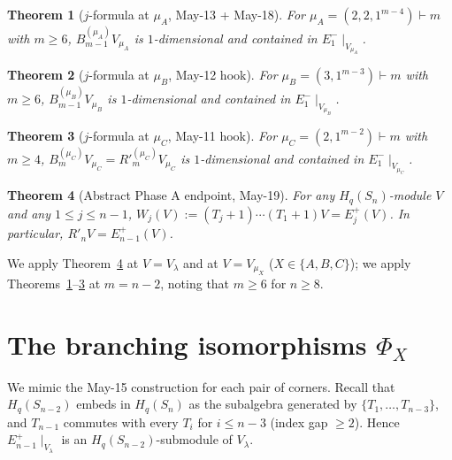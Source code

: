 \documentclass[11pt]{article}
\newtheorem{theorem}{Theorem}
\theoremstyle{definition}
\begin{document}
\begin{theorem}[$j$-formula at $\mu_A$, May-13 + May-18]\label{thm:muA}
For $\mu_A=(2,2,1^{m-4})\vdash m$ with $m\ge 6$,
$B_{m-1}^{(\mu_A)} V_{\mu_A}$ is $1$-dimensional and contained in
$E_1^-\!\mid_{V_{\mu_A}}$.
\end{theorem}

\begin{theorem}[$j$-formula at $\mu_B$, May-12 hook]\label{thm:muB}
For $\mu_B=(3,1^{m-3})\vdash m$ with $m\ge 6$,
$B_{m-1}^{(\mu_B)} V_{\mu_B}$ is $1$-dimensional and contained in
$E_1^-\!\mid_{V_{\mu_B}}$.
\end{theorem}

\begin{theorem}[$j$-formula at $\mu_C$, May-11 hook]\label{thm:muC}
For $\mu_C=(2,1^{m-2})\vdash m$ with $m\ge 4$,
$B_m^{(\mu_C)} V_{\mu_C}=R'^{(\mu_C)}_m V_{\mu_C}$ is
$1$-dimensional and contained in $E_1^-\!\mid_{V_{\mu_C}}$.
\end{theorem}

\begin{theorem}[Abstract Phase A endpoint, May-19]\label{thm:phaseA}
For any $H_q(S_n)$-module $V$ and any $1\le j\le n-1$,
$W_j(V):=(T_j{+}1)\cdots(T_1{+}1)V=E_j^+(V)$.  In particular,
$R'_n V=E_{n-1}^+(V)$.
\end{theorem}

We apply Theorem~\ref{thm:phaseA} at $V=V_\lambda$ and
at $V=V_{\mu_X}$ ($X\in\{A,B,C\}$); we apply
Theorems~\ref{thm:muA}--\ref{thm:muC} at $m=n-2$, noting that
$m\ge 6$ for $n\ge 8$.

\section{The branching isomorphisms $\Phi_X$}\label{sec:Phi}

We mimic the May-15 construction for each pair of corners.  Recall
that $H_q(S_{n-2})$ embeds in $H_q(S_n)$ as the subalgebra
generated by $\{T_1,\ldots,T_{n-3}\}$, and $T_{n-1}$ commutes with
every $T_i$ for $i\le n-3$ (index gap $\ge 2$).  Hence
$E_{n-1}^+\!\mid_{V_\lambda}$ is an $H_q(S_{n-2})$-submodule of
$V_\lambda$.
\end{document}
